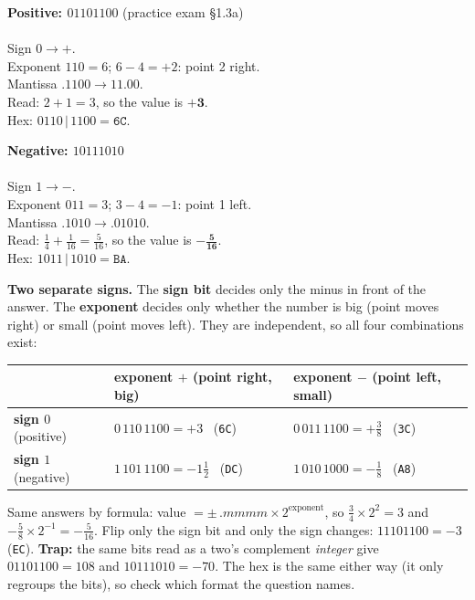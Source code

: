 \documentclass{fkt-notes}
\newcommand{\hx}[1]{\texttt{#1}}
\begin{document}
\noindent
\begin{minipage}[t]{0.48\linewidth}
  \textbf{Positive: $01101100$} (practice exam \S1.3a)\\[2pt]
  \\[2pt]
  Sign $0\to{+}$.\\
  Exponent $110=6$; $6-4=+2$: point 2 right.\\
  Mantissa $.1100\to 11.00$.\\
  Read: $2+1=3$, so the value is $\mathbf{+3}$.\\
  Hex: $0110\,|\,1100=\mathbf{\hx{6C}}$.
\end{minipage}\hfill
\begin{minipage}[t]{0.48\linewidth}
  \textbf{Negative: $10111010$}\\[2pt]
  \\[2pt]
  Sign $1\to{-}$.\\
  Exponent $011=3$; $3-4=-1$: point 1 left.\\
  Mantissa $.1010\to .01010$.\\
  Read: $\frac14+\frac1{16}=\frac5{16}$, so the value is $\mathbf{-\frac5{16}}$.\\
  Hex: $1011\,|\,1010=\mathbf{\hx{BA}}$.
\end{minipage}

\medskip
\noindent\textbf{Two separate signs.} The \textbf{sign bit} decides only the minus in front of
the answer. The \textbf{exponent} decides only whether the number is big (point moves right)
or small (point moves left). They are independent, so all four combinations exist:
\begin{center}
  \renewcommand{\arraystretch}{1.3}
  \begin{tabular}{@{}l|l|l@{}}
    & \textbf{exponent $+$} (point right, big) & \textbf{exponent $-$} (point left, small) \\
    \hline
    \textbf{sign $0$} (positive) & $0\,110\,1100=+3$ \ (\hx{6C}) & $0\,011\,1100=+\frac38$ \ (\hx{3C}) \\
    \textbf{sign $1$} (negative) & $1\,101\,1100=-1\frac12$ \ (\hx{DC}) & $1\,010\,1000=-\frac18$ \ (\hx{A8}) \\
  \end{tabular}
\end{center}

\noindent Same answers by formula: value $=\pm\,.mmmm\times2^{\text{exponent}}$, so
$\frac34\times2^2=3$ and $-\frac58\times2^{-1}=-\frac5{16}$.
Flip only the sign bit and only the sign changes: $11101100=-3$ (\hx{EC}).
\textbf{Trap:} the same bits read as a two's complement \emph{integer} give
$01101100=108$ and $10111010=-70$. The hex is the same either way (it only regroups the bits),
so check which format the question names.
\end{document}
